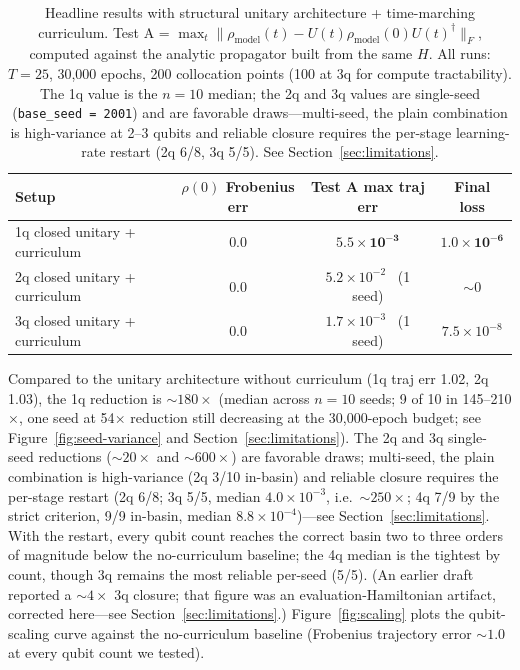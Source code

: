 \documentclass[11pt]{article}
\begin{document}
\begin{table}[H]
\centering
\begin{tabular}{lccc}
\toprule
Setup & $\rho(0)$ Frobenius err & Test A max traj err & Final loss \\
\midrule
1q closed unitary + curriculum & $0.0$ & $\mathbf{5.5 \times 10^{-3}}$ & $\mathbf{1.0 \times 10^{-6}}$ \\
2q closed unitary + curriculum & $0.0$ & $5.2 \times 10^{-2}$ \, (1 seed) & $\sim 0$ \\
3q closed unitary + curriculum & $0.0$ & $1.7 \times 10^{-3}$ \, (1 seed) & $7.5 \times 10^{-8}$ \\
\bottomrule
\end{tabular}
\caption{Headline results with structural unitary architecture + time-marching curriculum. Test A = $\max_t \| \rho_{\mathrm{model}}(t) - U(t) \rho_{\mathrm{model}}(0) U(t)^\dagger \|_F$, computed against the analytic propagator built from the same $H$. All runs: $T = 25$, 30{,}000 epochs, 200 collocation points (100 at 3q for compute tractability). The 1q value is the $n = 10$ median; the 2q and 3q values are single-seed (\texttt{base\_seed = 2001}) and are favorable draws---multi-seed, the plain combination is high-variance at 2--3 qubits and reliable closure requires the per-stage learning-rate restart (2q 6/8, 3q 5/5). See Section~\ref{sec:limitations}.}
\label{tab:headline}
\end{table}

Compared to the unitary architecture without curriculum (1q traj err 1.02, 2q 1.03), the 1q reduction is $\sim 180\times$ (median across $n = 10$ seeds; 9 of 10 in 145--210$\times$, one seed at 54$\times$ reduction still decreasing at the 30{,}000-epoch budget; see Figure~\ref{fig:seed-variance} and Section~\ref{sec:limitations}). The 2q and 3q single-seed reductions ($\sim 20\times$ and $\sim 600\times$) are favorable draws; multi-seed, the plain combination is high-variance (2q 3/10 in-basin) and reliable closure requires the per-stage restart (2q 6/8; 3q 5/5, median $4.0\times10^{-3}$, i.e.\ $\sim\!250\times$; 4q 7/9 by the strict criterion, 9/9 in-basin, median $8.8\times10^{-4}$)---see Section~\ref{sec:limitations}. With the restart, every qubit count reaches the correct basin two to three orders of magnitude below the no-curriculum baseline; the 4q median is the tightest by count, though 3q remains the most reliable per-seed (5/5). (An earlier draft reported a $\sim 4\times$ 3q closure; that figure was an evaluation-Hamiltonian artifact, corrected here---see Section~\ref{sec:limitations}.) Figure~\ref{fig:scaling} plots the qubit-scaling curve against the no-curriculum baseline (Frobenius trajectory error $\sim 1.0$ at every qubit count we tested).
\end{document}
